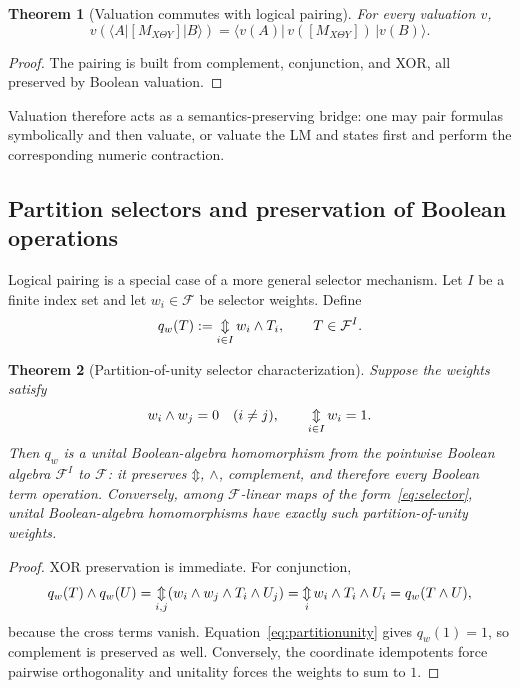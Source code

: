 \documentclass[11pt]{article}
\newtheorem{theorem}{Theorem}[section]
\theoremstyle{definition}
\theoremstyle{remark}
\newcommand{\cF}{\mathcal F}
\newcommand{\xor}{\mathbin{\Updownarrow}}
\newcommand{\bigxor}{\mathop{\Updownarrow}\displaylimits}
\begin{document}
\begin{theorem}[Valuation commutes with logical pairing]
For every valuation $v$,
\begin{equation}
 v\!\left(\langle A|[M_{X\Theta Y}]|B\rangle\right)
 =\langle v(A)|\,v([M_{X\Theta Y}])\,|v(B)\rangle.
 \label{eq:pairingcommutes}
\end{equation}
\end{theorem}
\begin{proof}
The pairing is built from complement, conjunction, and XOR, all preserved by Boolean valuation.
\end{proof}

Valuation therefore acts as a semantics-preserving bridge: one may pair formulas symbolically and then valuate, or valuate the LM and states first and perform the corresponding numeric contraction.

\subsection{Partition selectors and preservation of Boolean operations}

Logical pairing is a special case of a more general selector mechanism.  Let $I$ be a finite index set and let $w_i\in\cF$ be selector weights.  Define
\begin{equation}
 q_w(T):=\bigxor_{i\in I} w_i\land T_i,
 \qquad T\in\cF^I.
 \label{eq:selector}
\end{equation}

\begin{theorem}[Partition-of-unity selector characterization]
Suppose the weights satisfy
\begin{equation}
 w_i\land w_j=0\quad(i\ne j),
 \qquad
 \bigxor_{i\in I}w_i=1.
 \label{eq:partitionunity}
\end{equation}
Then $q_w$ is a unital Boolean-algebra homomorphism from the pointwise Boolean algebra $\cF^I$ to $\cF$: it preserves $\xor$, $\land$, complement, and therefore every Boolean term operation.  Conversely, among $\cF$-linear maps of the form~\eqref{eq:selector}, unital Boolean-algebra homomorphisms have exactly such partition-of-unity weights.
\end{theorem}
\begin{proof}
XOR preservation is immediate.  For conjunction,
\[
 q_w(T)\land q_w(U)
 =\bigxor_{i,j}(w_i\land w_j\land T_i\land U_j)
 =\bigxor_i w_i\land T_i\land U_i
 =q_w(T\land U),
\]
because the cross terms vanish.  Equation~\eqref{eq:partitionunity} gives $q_w(1)=1$, so complement is preserved as well.  Conversely, the coordinate idempotents force pairwise orthogonality and unitality forces the weights to sum to $1$.
\end{proof}
\end{document}
